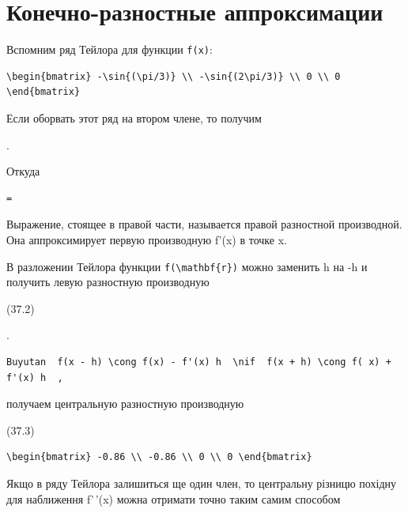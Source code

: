 \documentclass[
  ukrainian,
]{article}
\begin{document}
\section{Конечно-разностные
аппроксимации}\label{ux43aux43eux43dux435ux447ux43dux43e-ux440ux430ux437ux43dux43eux441ux442ux43dux44bux435-ux430ux43fux43fux440ux43eux43aux441ux438ux43cux430ux446ux438ux438}

Вспомним ряд Тейлора для функции \texttt{f(x)}:

\begin{verbatim}
\begin{bmatrix} -\sin{(\pi/3)} \\ -\sin{(2\pi/3)} \\ 0 \\ 0 \end{bmatrix}
\end{verbatim}

Если оборвать этот ряд на втором члене, то получим

.

Откуда

\begin{verbatim}
=
\end{verbatim}

Выражение, стоящее в правой части, называется правой разностной
производной. Она аппроксимирует первую производную f'(x) в точке x.

В разложении Тейлора функции \texttt{f(\textbackslash{}mathbf\{r\})}
можно заменить h на -h и получить левую разностную производную

(37.2)

.

\begin{verbatim}
Buyutan  f(x - h) \cong f(x) - f'(x) h  \nif  f(x + h) \cong f( x) + f'(x) h  ,
\end{verbatim}

получаем центральную разностную производную

(37.3)

\begin{verbatim}
\begin{bmatrix} -0.86 \\ -0.86 \\ 0 \\ 0 \end{bmatrix}
\end{verbatim}

Якщо в ряду Тейлора залишиться ще один член, то центральну різницю
похідну для наближення f'\,'(x) можна отримати точно таким самим
способом
\end{document}
